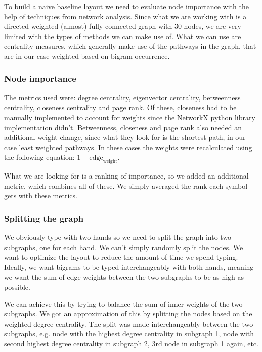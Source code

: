 \documentclass[9pt,twocolumn,twoside]{pnas-report}
\begin{document}
{To build a naive baseline layout we need to evaluate node importance with the help of techniques from network analysis.
Since what we are working with is a directed weighted (almost) fully connected graph with 30 nodes, we are very limited with the types of methods we can make use of.
What we can use are centrality measures, which generally make use of the pathways in the graph, that are in our case weighted based on bigram occurrence.

\subsubsection*{Node importance}

The metrics used were: degree centrality, eigenvector centrality, betweenness centrality, closeness centrality and page rank.
Of these, closeness had to be manually implemented to account for weights since the NetworkX python library implementation didn't.
Betweenness, closeness and page rank also needed an additional weight change, since what they look for is the shortest path, in our case least weighted pathways.
In these cases the weights were recalculated using the following equation: $1 - \text{edge}_\text{weight}$.

What we are looking for is a ranking of importance, so we added an additional metric, which combines all of these.
We simply averaged the rank each symbol gets with these metrics.

\subsubsection*{Splitting the graph}

We obviously type with two hands so we need to split the graph into two subgraphs, one for each hand.
We can't simply randomly split the nodes.
We want to optimize the layout to reduce the amount of time we spend typing.
Ideally, we want bigrams to be typed interchangeably with both hands, meaning we want the sum of edge weights between the two subgraphs to be as high as possible.

We can achieve this by trying to balance the sum of inner weights of the two subgraphs.
We got an approximation of this by splitting the nodes based on the weighted degree centrality.
The split was made interchangeably between the two subgraphs, e.g. node with the highest degree centrality in subgraph 1, node with second highest degree centrality in subgraph 2, 3rd node in subgraph 1 again, etc.

}
\end{document}
